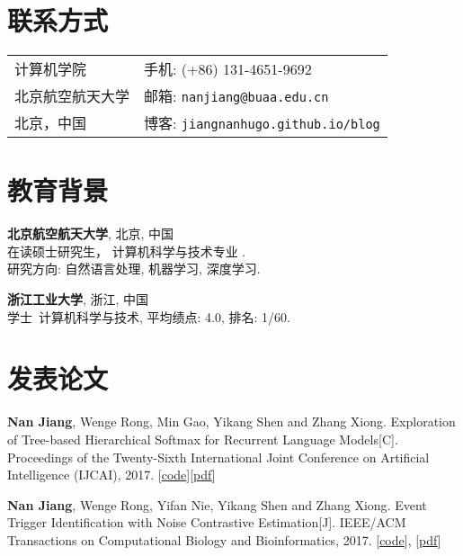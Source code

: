\documentclass[margin,line]{resume}
\begin{document}
\begin{resume}
\section{联系方式}
\begin{tabular}{@{}p{3in}p{3in}}
计算机学院 & { 手机:}  (+86) 131-4651-9692 \\
北京航空航天大学  & { 邮箱:}  {\tt nanjiang@buaa.edu.cn} \\
北京，中国         & { 博客:} {\tt jiangnanhugo.github.io/blog} 
\end{tabular}
\vspace{-0.5em}

\section{教育背景}
{\bf 北京航空航天大学}, 北京,  中国\\
在读硕士研究生， 计算机科学与技术专业 . \\
研究方向: 自然语言处理, 机器学习, 深度学习. 
\vspace{0.5em}

{\bf 浙江工业大学}, 浙江, 中国\\
学士\ 计算机科学与技术, 平均绩点: 4.0, 排名: 1/60.


\section{发表论文}

\textbf{Nan Jiang}, Wenge Rong, Min Gao, Yikang Shen and Zhang Xiong. Exploration of Tree-based Hierarchical Softmax for Recurrent Language Models[C]. Proceedings of the Twenty-Sixth International Joint Conference on Artificial Intelligence (IJCAI), 2017. [\href{https://github.com/jiangnanHugo/lmkit}{code}][\href{https://www.ijcai.org/proceedings/2017/0271.pdf}{pdf}]

\textbf{Nan Jiang}, Wenge Rong, Yifan Nie, Yikang Shen and Zhang Xiong. Event Trigger Identification with Noise Contrastive Estimation[J]. IEEE/ACM Transactions on Computational Biology and Bioinformatics, 2017. [\href{https://github.com/jiangnanHugo/mlee-nce}{code}], [\href{https://github.com/jiangnanhugo/paper/blob/master/APBC2017/APBC2017.pdf}{pdf}]
%


\end{resume}
\end{document}
